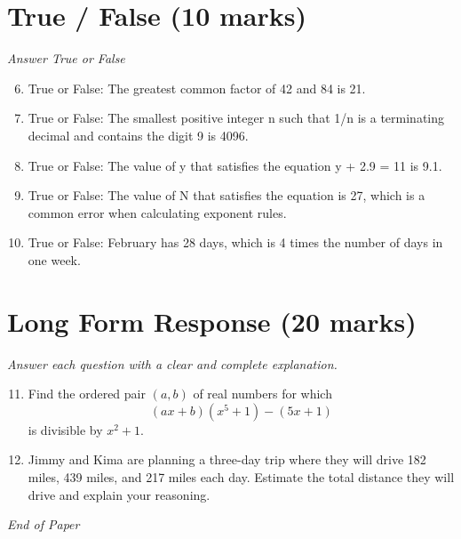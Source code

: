 \documentclass[12pt]{article}
\begin{document}
\section*{True / False (10 marks)}
\textit{Answer True or False}
\begin{enumerate}[label=\arabic*.]
\setcounter{enumi}{5}
\item True or False: The greatest common factor of 42 and 84 is 21.
\item True or False: The smallest positive integer n such that 1/n is a terminating decimal and contains the digit 9 is 4096.
\item True or False: The value of y that satisfies the equation y + 2.9 = 11 is 9.1.
\item True or False: The value of N that satisfies the equation is 27, which is a common error when calculating exponent rules.
\item True or False: February has 28 days, which is 4 times the number of days in one week.
\end{enumerate}

\section*{Long Form Response (20 marks)}
\textit{Answer each question with a clear and complete explanation.}
\begin{enumerate}[label=\arabic*.]
\setcounter{enumi}{10}
\item Find the ordered pair $(a,b)$ of real numbers for which \[(ax + b)(x^5 + 1) - (5 x + 1)\]is divisible by $x^2 + 1.$
\item Jimmy and Kima are planning a three-day trip where they will drive 182 miles, 439 miles, and 217 miles each day. Estimate the total distance they will drive and explain your reasoning.
\end{enumerate}

\vfill
\noindent\textit{End of Paper}
\end{document}
